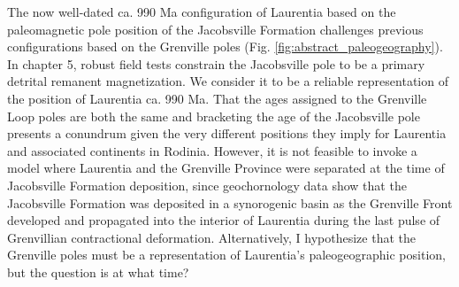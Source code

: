 The now well-dated ca. 990 Ma configuration of Laurentia based on the paleomagnetic pole position of the Jacobsville Formation challenges previous configurations based on the Grenville poles (Fig. \ref{fig:abstract_paleogeography}). In chapter 5, robust field tests constrain the Jacobsville pole to be a primary detrital remanent magnetization. We consider it to be a reliable representation of the position of Laurentia ca. 990 Ma. That the ages assigned to the Grenville Loop poles are both the same and bracketing the age of the Jacobsville pole presents a conundrum given the very different positions they imply for Laurentia and associated continents in Rodinia. However, it is not feasible to invoke a model where Laurentia and the Grenville Province were separated at the time of Jacobsville Formation deposition, since geochornology data show that the Jacobsville Formation was deposited in a synorogenic basin as the Grenville Front developed and propagated into the interior of Laurentia during the last pulse of Grenvillian contractional deformation. Alternatively, I hypothesize that the Grenville poles must be a representation of Laurentia's paleogeographic position, but the question is at what time? 

